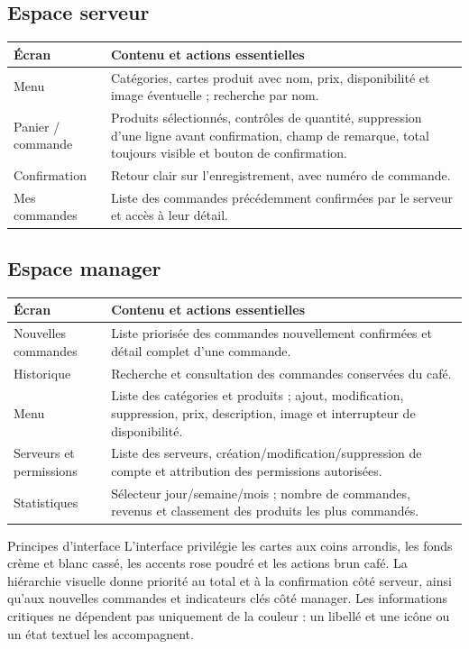 \documentclass[11pt,a4paper]{article}
\begin{document}
\subsection{Espace serveur}
\begin{tabularx}{\textwidth}{P{0.26\textwidth}Y}
\toprule
\textbf{Écran} & \textbf{Contenu et actions essentielles} \\
\midrule
Menu & Catégories, cartes produit avec nom, prix, disponibilité et image éventuelle ; recherche par nom. \\
Panier / commande & Produits sélectionnés, contrôles de quantité, suppression d’une ligne avant confirmation, champ de remarque, total toujours visible et bouton de confirmation. \\
Confirmation & Retour clair sur l’enregistrement, avec numéro de commande. \\
Mes commandes & Liste des commandes précédemment confirmées par le serveur et accès à leur détail. \\
\bottomrule
\end{tabularx}

\subsection{Espace manager}
\begin{tabularx}{\textwidth}{P{0.26\textwidth}Y}
\toprule
\textbf{Écran} & \textbf{Contenu et actions essentielles} \\
\midrule
Nouvelles commandes & Liste priorisée des commandes nouvellement confirmées et détail complet d’une commande. \\
Historique & Recherche et consultation des commandes conservées du café. \\
Menu & Liste des catégories et produits ; ajout, modification, suppression, prix, description, image et interrupteur de disponibilité. \\
Serveurs et permissions & Liste des serveurs, création/modification/suppression de compte et attribution des permissions autorisées. \\
Statistiques & Sélecteur jour/semaine/mois ; nombre de commandes, revenus et classement des produits les plus commandés. \\
\bottomrule
\end{tabularx}

\begin{infobox}{Principes d’interface}
L’interface privilégie les cartes aux coins arrondis, les fonds crème et blanc cassé, les accents rose poudré et les actions brun café. La hiérarchie visuelle donne priorité au total et à la confirmation côté serveur, ainsi qu’aux nouvelles commandes et indicateurs clés côté manager. Les informations critiques ne dépendent pas uniquement de la couleur : un libellé et une icône ou un état textuel les accompagnent.
\end{infobox}
\end{document}
